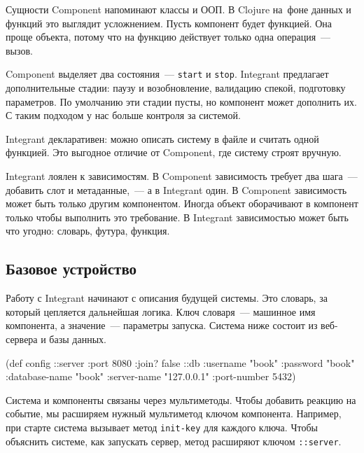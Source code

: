 
Сущности Component напоминают классы и ООП. В Clojure на~фоне данных и функций
это выглядит усложнением. Пусть компонент будет функцией. Она проще объекта,
потому что на функцию действует только одна операция~--- вызов.

Component выделяет два состояния~--- \verb|start| и \verb|stop|. Integrant
предлагает дополнительные стадии: паузу и возобновление, валидацию спекой,
подготовку параметров. По умолчанию эти стадии пусты, но компонент может
дополнить их. С таким подходом у нас больше контроля за системой.


Integrant декларативен: можно описать систему в файле и считать одной
функцией. Это выгодное отличие от Component, где систему строят вручную.

Integrant лоялен к зависимостям. В Component зависимость требует два шага~---
добавить слот и метаданные,~--- а в Integrant один. В Component зависимость
может быть только другим компонентом. Иногда объект оборачивают в компонент
только чтобы выполнить это требование. В Integrant зависимостью может быть что
угодно: словарь, футура, функция.

\subsection{Базовое устройство}

Работу с Integrant начинают с описания будущей системы. Это словарь, за который
цепляется дальнейшая логика. Ключ словаря~--- машинное имя компонента, а
значение~--- параметры запуска. Система ниже состоит из веб-сервера и базы
данных.

\begin{english}
  \begin{clojure}
(def config
  {::server {:port 8080 :join? false}
   ::db {:username      "book"
         :password      "book"
         :database-name "book"
         :server-name   "127.0.0.1"
         :port-number   5432}})
  \end{clojure}
\end{english}


Система и компоненты связаны через мультиметоды. Чтобы добавить реакцию на
событие, мы расширяем нужный мультиметод ключом компонента. Например, при старте
система вызывает метод \verb|init-key| для каждого ключа. Чтобы объяснить
системе, как запускать сервер, метод расширяют ключом \verb|::server|.


